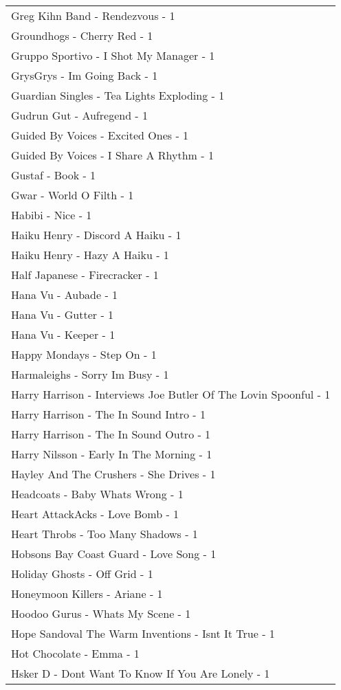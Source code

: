\documentclass[
]{article}
\begin{document}
\begin{longtable}{l}
Greg Kihn Band - Rendezvous - 1 \\ 
Groundhogs - Cherry Red - 1 \\ 
Gruppo Sportivo - I Shot My Manager - 1 \\ 
GrysGrys - Im Going Back - 1 \\ 
Guardian Singles - Tea Lights Exploding - 1 \\ 
Gudrun Gut - Aufregend - 1 \\ 
Guided By Voices - Excited Ones - 1 \\ 
Guided By Voices - I Share A Rhythm - 1 \\ 
Gustaf - Book - 1 \\ 
Gwar - World O Filth - 1 \\ 
Habibi - Nice - 1 \\ 
Haiku Henry - Discord A Haiku - 1 \\ 
Haiku Henry - Hazy A Haiku - 1 \\ 
Half Japanese - Firecracker - 1 \\ 
Hana Vu - Aubade - 1 \\ 
Hana Vu - Gutter - 1 \\ 
Hana Vu - Keeper - 1 \\ 
Happy Mondays - Step On - 1 \\ 
Harmaleighs - Sorry Im Busy - 1 \\ 
Harry Harrison - Interviews Joe Butler Of The Lovin Spoonful - 1 \\ 
Harry Harrison - The In Sound Intro - 1 \\ 
Harry Harrison - The In Sound Outro - 1 \\ 
Harry Nilsson - Early In The Morning - 1 \\ 
Hayley And The Crushers - She Drives - 1 \\ 
Headcoats - Baby Whats Wrong - 1 \\ 
Heart AttackAcks - Love Bomb - 1 \\ 
Heart Throbs - Too Many Shadows - 1 \\ 
Hobsons Bay Coast Guard - Love Song - 1 \\ 
Holiday Ghosts - Off Grid - 1 \\ 
Honeymoon Killers - Ariane - 1 \\ 
Hoodoo Gurus - Whats My Scene - 1 \\ 
Hope Sandoval The Warm Inventions - Isnt It True - 1 \\ 
Hot Chocolate - Emma - 1 \\ 
Hsker D - Dont Want To Know If You Are Lonely - 1 \\ 

\end{longtable}
\end{document}
